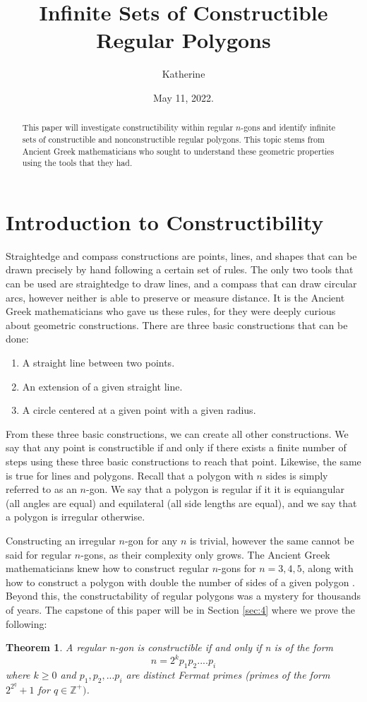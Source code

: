 \documentclass[reqno]{amsart}
\newtheorem{theorem}{Theorem}[section]
\theoremstyle{definition}
\numberwithin{equation}{section}
\newcommand{\bZ}{\mathbb{Z}}
\begin{document}
\title[Constructible Regular Polygons]{Infinite Sets of Constructible Regular Polygons}
\author{Katherine}
\date{May 11, 2022.}
\begin{abstract}This paper will investigate constructibility within regular $n$-gons and identify infinite sets of constructible and nonconstructible regular polygons. This topic stems from Ancient Greek mathematicians who sought to understand these geometric properties using the tools that they had.\end{abstract}
\maketitle
\section{Introduction to Constructibility}\label{sec:1}
Straightedge and compass constructions are points, lines, and shapes that can be drawn precisely by hand following a certain set of rules. The only two tools that can be used are straightedge to draw lines, and a compass that can draw circular arcs, however neither is able to preserve or measure distance. It is the Ancient Greek mathematicians who gave us these rules, for they were deeply curious about geometric constructions. There are three basic constructions that can be done:
\begin{enumerate}
  \item A straight line between two points.
  \item An extension of a given straight line.
  \item A circle centered at a given point with a given radius.
\end{enumerate}

From these three basic constructions, we can create all other constructions. We say that any point is constructible if and only if there exists a finite number of steps using these three basic constructions to reach that point. Likewise, the same is true for lines and polygons. Recall that a polygon with $n$ sides is simply referred to as an $n$-gon. We say that a polygon is regular if it it is equiangular (all angles are equal) and equilateral (all side lengths are equal), and we say that a polygon is irregular otherwise.

Constructing an irregular $n$-gon for any $n$ is trivial, however the same cannot be said for regular $n$-gons, as their complexity only grows. The Ancient Greek mathematicians knew how to construct regular $n$-gons for $n = 3,4,5$, along with how to construct a polygon with double the number of sides of a given polygon \cite{Bold}. Beyond this, the constructability of regular polygons was a mystery for thousands of years. The capstone of this paper will be in Section \ref{sec:4} where we prove the following:
\begin{theorem}\label{thm:gauss}A regular n-gon is constructible if and only if n is of the form $$n = 2^kp_1p_2....p_i$$ where $k \ge 0$ and $p_1,p_2,...p_i$ are distinct Fermat primes (primes of the form $2^{2^q} + 1$ for $q \in \bZ^+)$.\end{theorem}
\end{document}
